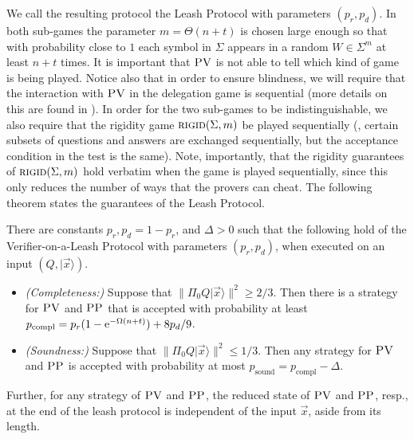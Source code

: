 \documentclass{toc}
\newcommand{\ket}[1]{|#1\rangle}
\DeclareMathOperator{\sound}{sound}
\DeclareMathOperator{\compl}{compl}
\newcommand{\rigid}{\textsc{rigid}}
\newcommand{\pv}{\textsc{PV}}
\newcommand{\pp}{\textsc{PP}}
\begin{document}
We call the resulting protocol the Leash Protocol with parameters $(p_r,p_d)$. In both sub-games the parameter $m=\Theta(n+t)$ is chosen large enough so that with probability close to $1$ each symbol in $\Sigma$ appears in a random $W\in \Sigma^m$ at least $n+t$ times. It is important that $\pv$ is not able to tell which kind of game is being played. Notice also that in order to ensure blindness, we will require that the interaction with $\pv$ in the delegation game is sequential (more details on this are found in ). In order for the two sub-games to be indistinguishable, we also require that the rigidity game $\rigid(\Sigma,m)$ be played sequentially (\ie, certain subsets of questions and answers are exchanged sequentially, but the acceptance condition in the test is the same). Note, importantly, that the rigidity guarantees of $\rigid(\Sigma,m)$ hold verbatim when the game is played sequentially, since this only reduces the number of ways that the provers can cheat. The following theorem states the guarantees of the Leash Protocol.

\begin{theorem}\label{thm:leash}
There are constants $p_r,p_d=1-p_r$, and $\Delta>0$ such that the following hold of the Verifier-on-a-Leash Protocol with parameters $(p_r,p_d)$, when executed on an input $(Q,\ket{\vec{x}})$.
\begin{itemize}
\item \emph{(Completeness:)} Suppose that $\|\Pi_0 Q\ket{\vec{x}}\|^2 \geq 2/3$. Then there is a strategy for $\pv$ and $\pp$ that is accepted with probability at least $p_{\compl} = p_r(1-\eee^{-\Omega(n+t)})+8p_d/9$. 
\item \emph{(Soundness:)} Suppose that $\|\Pi_0 Q\ket{\vec{x}}\|^2 \leq 1/3$. Then any strategy for $\pv$ and $\pp$ is accepted with probability at most $p_{\sound} = p_{\compl} - \Delta$. 
\end{itemize}
Further, for any strategy of $\pv$ and $\pp$, the reduced state of $\pv$
and $\pp$, resp.,  %
at the end of the leash protocol is independent of the input $\vec{x}$, 
aside from its length.
\end{theorem}
\end{document}
